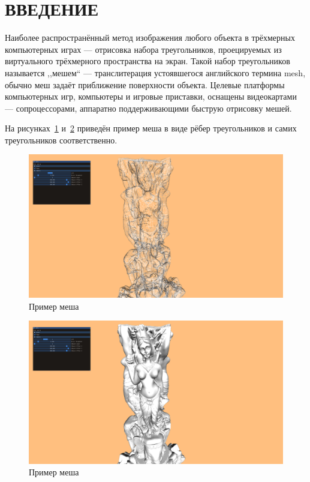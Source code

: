 \clearpage
\section{ВВЕДЕНИЕ}
Наиболее распространённый метод изображения любого объекта в трёхмерных компьютерных играх --- отрисовка набора треугольников, проецируемых из виртуального трёхмерного пространства на экран.
Такой набор треугольников называется ,,мешем`` --- транслитерация устоявшегося английского термина mesh, обычно меш задаёт приближение поверхности объекта.
Целевые платформы компьютерных игр, компьютеры и игровые приставки, оснащены видеокартами --- сопроцессорами, аппаратно поддерживающими быструю отрисовку мешей.

На рисунках~\ref{fig:mesh-example-wireframe} и~\ref{fig:mesh-example-solid} приведён пример меша в виде рёбер треугольников и самих треугольников соответственно.

\begin{figure}[H]
    \centering
    \includegraphics[width=\textwidth]{pics/mesh-example-wireframe.png}
    \caption{Пример меша}
    \label{fig:mesh-example-wireframe}
\end{figure}

\begin{figure}[H]
    \centering
    \includegraphics[width=\textwidth]{pics/mesh-example-solid.png}
    \caption{Пример меша}
    \label{fig:mesh-example-solid}
\end{figure}

